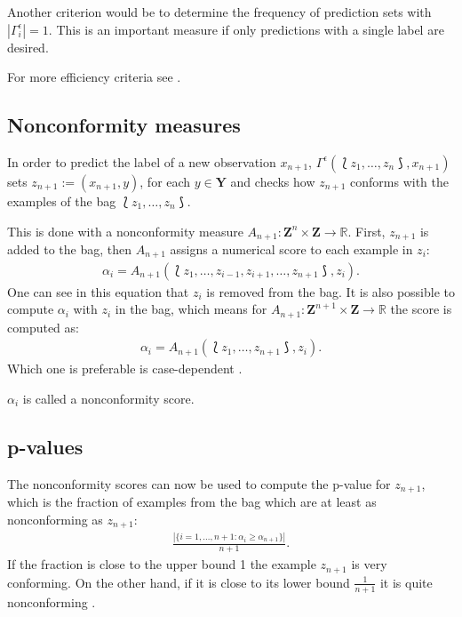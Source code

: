 \documentclass[twoside,11pt]{article}
\begin{document}
Another criterion would be to determine the frequency of
prediction sets with $|\Gamma^{\epsilon}_i|=1$.
This is an important measure if only predictions with a
single label are desired.

For more efficiency criteria see \citet{vovk_et_al_2016}.

\subsection*{Nonconformity measures}

In order to predict the label of a new observation
$x_{n+1}$,
$\Gamma^{\epsilon}(\Lbag z_1,\dots,z_n \Rbag, x_{n+1})$
sets $z_{n+1}:=(x_{n+1}, y)$, for each $y \in \textbf{Y}$
and checks how $z_{n+1}$ conforms with the examples of the
bag $\Lbag z_1,\dots,z_n \Rbag$.

This is done with a nonconformity measure
$A_{n+1}:\textbf{Z}^n \times \textbf{Z} \rightarrow
\mathbb{R}$. First, $z_{n+1}$ is added to the bag, then
$A_{n+1}$ assigns a numerical score to each example in
$z_i$:
\begin{align}
  \alpha_i = A_{n+1}(\Lbag z_1,\dots,z_{i-1},z_{i+1},
             \dots,z_{n+1} \Rbag, z_i).
\label{eq:a0}
\end{align}
One can see in this equation that $z_i$ is removed from the
bag. It is also possible to compute $\alpha_i$ with $z_i$
in the bag, which means for
$A_{n+1}:\textbf{Z}^{n+1} \times \textbf{Z} \rightarrow
\mathbb{R}$ the score is computed as:
\begin{align}
  \alpha_i = A_{n+1}(\Lbag z_1,\dots,z_{n+1} \Rbag, z_i).
\label{eq:a1}
\end{align}
Which one is preferable is case-dependent
\citep[see][Chapter 4.2.2]{shafer_et_al_2008}.

$\alpha_i$ is called a nonconformity score.

\subsection*{p-values}

The nonconformity scores can now be used to compute the
p-value for $z_{n+1}$, which is the fraction of examples
from the bag which are at least as nonconforming as
$z_{n+1}$:
\begin{align}
  \frac{|\{i=1,\dots,n+1: \alpha_i \geq \alpha_{n+1}\}|}
       {n + 1}.
\label{eq:p0}
\end{align}
If the fraction is close to the upper bound 1 the example
$z_{n+1}$ is very conforming. On the other hand, if it is
close to its lower bound $\frac{1}{n+1}$ it is quite
nonconforming \citep[see][Chapter 2]{alrw}.
\end{document}
